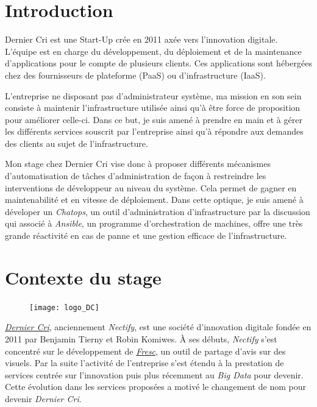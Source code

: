 \newpage

\section{Introduction}\label{introduction}

\bigskip

Dernier Cri est une Start-Up crée en 2011 axée vers l'innovation
digitale. L'équipe est en charge du développement, du déploiement et de
la maintenance d'applications pour le compte de plusieurs clients. Ces
applications sont hébergées chez des fournisseurs de plateforme (PaaS)
ou d'infrastructure (IaaS).

\bigskip

L'entreprise ne disposant pas d'administrateur système, ma mission en
son sein consiste à maintenir l'infrastructure utilisée ainsi qu'à être
force de proposition pour améliorer celle-ci. Dans ce but, je suis amené
à prendre en main et à gérer les différents services souscrit par
l'entreprise ainsi qu'à répondre aux demandes des clients au sujet de
l'infrastructure.

\bigskip

Mon stage chez Dernier Cri vise donc à proposer différents mécanismes
d'automatisation de tâches d'administration de façon à restreindre les
interventions de développeur au niveau du système. Cela permet de gagner
en maintenabilité et en vitesse de déploiement. Dans cette optique, je
suis amené à déveloper un \emph{Chatops}, un outil d'administration
d'infrastructure par la discussion qui associé à \emph{Ansible}, un
programme d'orchestration de machines, offre une très grande réactivité
en cas de panne et une gestion efficace de l'infrastructure.

\newpage

\section{Contexte du stage}\label{contexte-du-stage}

\begin{figure}[htbp]
\centering
\texttt{[image: logo\_DC]}
\caption{}
\end{figure}

\emph{\href{http://derniercri.io}{Dernier Cri}}, anciennement
\emph{Nectify}, est une société d'innovation digitale fondée en 2011 par
Benjamin Tierny et Robin Komiwes. À ses débuts, \emph{Nectify} s'est
concentré sur le développement de \emph{\href{http://fre.sc}{Fresc}}, un
outil de partage d'avis sur des visuels. Par la suite l'activité de
l'entreprise s'est étendu à la prestation de services centrée sur
l'innovation puis plus récemment au \emph{Big Data} pour devenir. Cette
évolution dans les services proposées a motivé le changement de nom pour
devenir \emph{Dernier Cri}.

